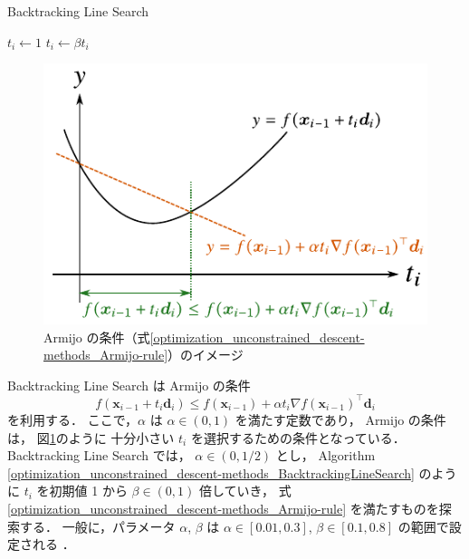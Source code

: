 \begin{algorithm}[tp]
    \caption{Backtracking Line Search \cite[Section 9.2]{Boyd2004}}
    \label{optimization_unconstrained_descent-methods_BacktrackingLineSearch}
    \begin{algorithmic}
            \State $t_i \gets 1$
                \State $t_i \gets \beta t_i$
            \EndWhile
        \EndProcedure
    \end{algorithmic}
\end{algorithm}

\begin{figure}[tp]
    \centering
    \includegraphics[width=0.7\linewidth]{optimization/Armijo-rule-image.pdf}
    \caption{Armijo の条件（式\eqref{optimization_unconstrained_descent-methods_Armijo-rule}）のイメージ}
    \label{optimization_unconstrained_descent-methods_Armijo-rule-image}
\end{figure}

Backtracking Line Search \cite[Section 9.2]{Boyd2004} は
Armijo の条件 \cite[Section 7.5]{Luenberger2003}
\begin{equation}
    f(\bm{x}_{i-1} + t_i \bm{d}_i) \le f(\bm{x}_{i-1}) + \alpha t_i \nabla f(\bm{x}_{i-1})^\top \bm{d}_i
    \label{optimization_unconstrained_descent-methods_Armijo-rule}
\end{equation}
を利用する．
ここで，$\alpha$ は $\alpha \in (0,1)$ を満たす定数であり，
Armijo の条件は，
図\ref{optimization_unconstrained_descent-methods_Armijo-rule-image}のように
十分小さい $t_i$ を選択するための条件となっている．
Backtracking Line Search では，
$\alpha \in (0, 1/2)$ とし，
Algorithm \ref{optimization_unconstrained_descent-methods_BacktrackingLineSearch}
のように
$t_i$ を初期値 1 から $\beta \in (0, 1)$ 倍していき，
式 \eqref{optimization_unconstrained_descent-methods_Armijo-rule} を満たすものを探索する．
一般に，パラメータ $\alpha$, $\beta$ は
$\alpha \in [0.01, 0.3]$, $\beta \in [0.1, 0.8]$ の範囲で設定される
\cite[Section 9.2]{Boyd2004}．

